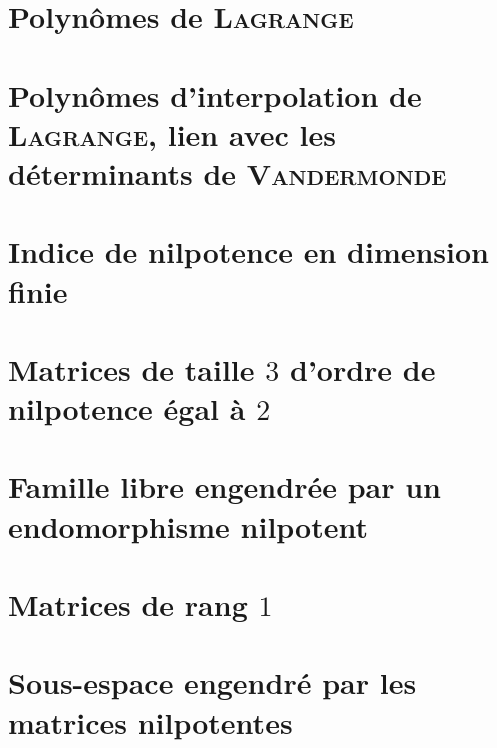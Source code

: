 \section{Polynômes de \textsc{Lagrange}} 


\section{Polynômes d'interpolation de \textsc{Lagrange}, lien avec les déterminants de \textsc{Vandermonde}}


\section{Indice de nilpotence en dimension finie} \label{indice_nilpotence}


\section{Matrices de taille $3$ d'ordre de nilpotence égal à $2$}


\section{Famille libre engendrée par un endomorphisme nilpotent}


\section{Matrices de rang $1$}


\section{Sous-espace engendré par les matrices nilpotentes}
